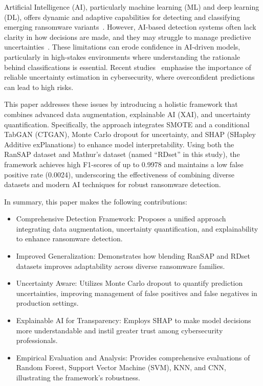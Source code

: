 Artificial Intelligence (AI), particularly machine learning (ML) and deep learning (DL), offers dynamic and adaptive capabilities for detecting and classifying emerging ransomware variants~\cite{sikorski2012practical, beaman2021ransomware}. However, AI-based detection systems often lack clarity in how decisions are made, and they may struggle to manage predictive uncertainties~\cite{gawlikowski2023Uncertainity}. These limitations can  erode confidence in AI-driven models, particularly in high-stakes environments where understanding the rationale behind  classifications is essential. Recent studies~\cite{gal2016dropout, gawlikowski2023Uncertainity} 
emphasise the importance of reliable uncertainty estimation in cybersecurity, where overconfident predictions can lead to high risks.

This paper addresses these  issues by introducing a holistic framework that combines advanced data augmentation, explainable AI (XAI), and uncertainty quantification. Specifically, the approach integrates SMOTE and a conditional TabGAN (CTGAN), Monte Carlo dropout for uncertainty, and SHAP (SHapley Additive exPlanations) to enhance model interpretability. Using both the RanSAP \cite{hirano2022ransap} dataset and Mathur's \cite{mathur2020ransomware} dataset (named “RDset” in this study), the framework achieves high F1-scores of up to 0.9978 and maintains a low false positive rate (0.0024), underscoring the effectiveness of combining diverse datasets and modern AI techniques for robust ransomware detection.

In summary, this paper makes the following contributions:
\begin{itemize}
    \item Comprehensive Detection Framework: Proposes a unified approach integrating data augmentation, uncertainty quantification, and explainability to enhance ransomware detection.
    \item Improved Generalization: Demonstrates how blending RanSAP and RDset datasets improves adaptability across diverse ransomware families.
    \item Uncertainty Aware: Utilizes Monte Carlo dropout to quantify prediction uncertainties, improving management of false positives and false negatives  in production settings.
    \item Explainable AI for Transparency: Employs SHAP to make model decisions more understandable and instil greater trust among cybersecurity professionals.
    \item Empirical Evaluation and Analysis: Provides comprehensive evaluations  of Random Forest, Support Vector Machine (SVM), KNN, and CNN, illustrating the framework's robustness.
\end{itemize}

